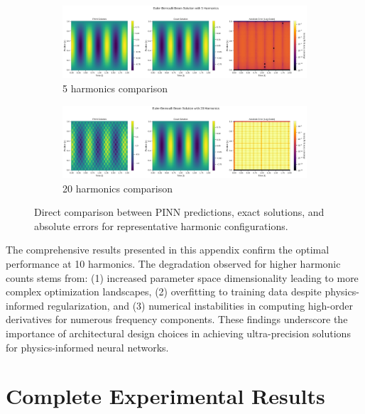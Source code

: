 \begin{figure}[H]
    \centering
    \begin{subfigure}[b]{0.48\textwidth}
        \centering
        \includegraphics[width=\textwidth]{figures/comparison_5h.png}
        \caption{5 harmonics comparison}
    \end{subfigure}
    \hfill
    \begin{subfigure}[b]{0.48\textwidth}
        \centering
        \includegraphics[width=\textwidth]{figures/comparison_20h.png}
        \caption{20 harmonics comparison}
    \end{subfigure}
    \caption{Direct comparison between PINN predictions, exact solutions, and absolute errors for representative harmonic configurations.}
    \label{fig:direct_comparison}
\end{figure}

The comprehensive results presented in this appendix confirm the optimal performance at 10 harmonics. The degradation observed for higher harmonic counts stems from: (1) increased parameter space dimensionality leading to more complex optimization landscapes, (2) overfitting to training data despite physics-informed regularization, and (3) numerical instabilities in computing high-order derivatives for numerous frequency components. These findings underscore the importance of architectural design choices in achieving ultra-precision solutions for physics-informed neural networks.

\section{Complete Experimental Results}

